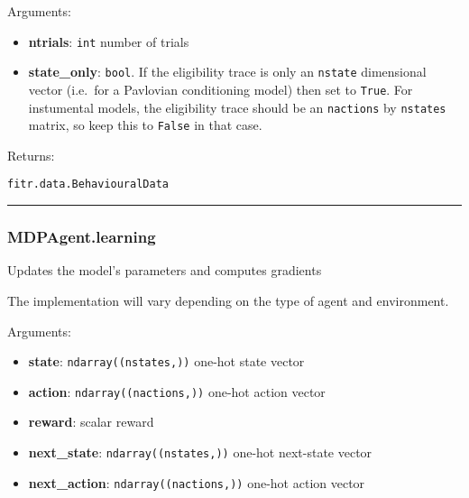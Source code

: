 Arguments:

\begin{itemize}
\tightlist
\item
  \textbf{ntrials}: \texttt{int} number of trials
\item
  \textbf{state\_only}: \texttt{bool}. If the eligibility trace is only
  an \texttt{nstate} dimensional vector (i.e.~for a Pavlovian
  conditioning model) then set to \texttt{True}. For instumental models,
  the eligibility trace should be an \texttt{nactions} by
  \texttt{nstates} matrix, so keep this to \texttt{False} in that case.
\end{itemize}

Returns:

\texttt{fitr.data.BehaviouralData}

\begin{center}\rule{0.5\linewidth}{\linethickness}\end{center}

\subsubsection{MDPAgent.learning}\label{mdpagent.learning}

\begin{Shaded}
\begin{Highlighting}[]
\end{Highlighting}
\end{Shaded}

Updates the model's parameters and computes gradients

The implementation will vary depending on the type of agent and
environment.

Arguments:

\begin{itemize}
\tightlist
\item
  \textbf{state}: \texttt{ndarray((nstates,))} one-hot state vector
\item
  \textbf{action}: \texttt{ndarray((nactions,))} one-hot action vector
\item
  \textbf{reward}: scalar reward
\item
  \textbf{next\_state}: \texttt{ndarray((nstates,))} one-hot next-state
  vector
\item
  \textbf{next\_action}: \texttt{ndarray((nactions,))} one-hot action
  vector
\end{itemize}

